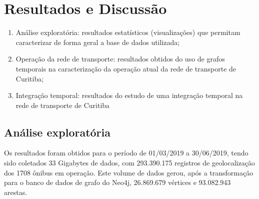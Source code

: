 
\chapter{Resultados e Discussão}\label{cap:resultadosediscussao}



\begin{enumerate}
    \item Análise exploratória: resultados estatísticos (visualizações) que permitam caracterizar de forma geral a base de dados utilizada;
    \item Operação da rede de transporte: resultados obtidos do uso de grafos temporais na caracterização da operação atual da rede de transporte de Curitiba;
    \item Integração temporal: resultados do estudo de uma integração temporal na rede de transporte de Curitiba
\end{enumerate}

\section{Análise exploratória}

Os resultados foram obtidos para o período de  01/03/2019 a 30/06/2019, tendo sido coletados 33 Gigabytes de dados, com 293.390.175 registros de geolocalização dos 1708 ônibus em operação. Este volume de dados gerou, após a transformação para o banco de dados de grafo do Neo4j, 26.869.679 vértices e 93.082.943 arestas.


